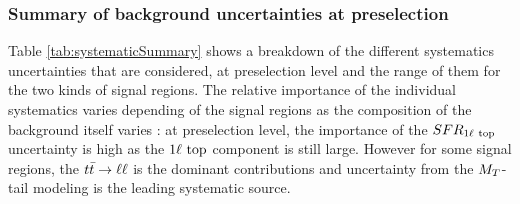             \subsubsection{Summary of background uncertainties at preselection}
           
            Table \ref{tab:systematicSummary} shows a breakdown of the different systematics
            uncertainties that are considered, at preselection level and the range of them
            for the two kinds of signal regions. The relative importance of the individual 
            systematics varies depending of the signal regions as the composition of the 
            background itself varies : at preselection level, the importance of the 
            $SFR_{1\ell~\text{top}}$ uncertainty is high as the $1\ell~\text{top}$ component is still large.
            However for some signal regions, the $t\bar{t} \rightarrow \ell \ell$ is the dominant contributions and
            uncertainty from the $M_T$-tail modeling is the leading systematic source.


